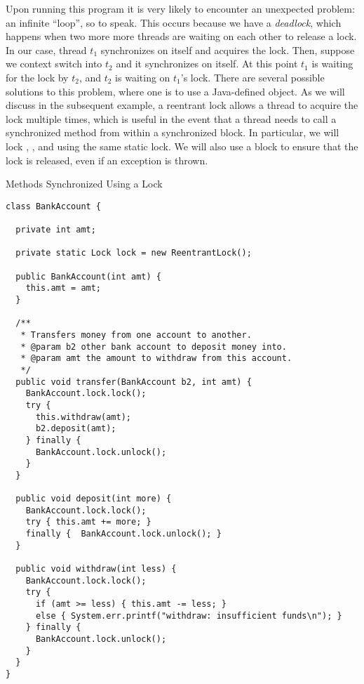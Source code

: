 Upon running this program it is very likely to encounter an unexpected problem: an infinite ``loop'', so to speak. This occurs because we have a \textit{deadlock}, which happens when two more more threads are waiting on each other to release a lock. In our case, thread $t_1$ synchronizes on itself and acquires the lock. Then, suppose we context switch into $t_2$ and it synchronizes on itself. At this point $t_1$ is waiting for the lock by $t_2$, and $t_2$ is waiting on $t_1$'s lock. There are several possible solutions to this problem, where one is to use a Java-defined  object. As we will discuss in the subsequent example, a reentrant lock allows a thread to acquire the lock multiple times, which is useful in the event that a thread needs to call a synchronized method from within a synchronized block. In particular, we will lock , , and  using the same static lock. We will also use a  block to ensure that the lock is released, even if an exception is thrown.

\begin{cl}[]{Methods Synchronized Using a Lock}
\begin{lstlisting}[language=MyJava]
class BankAccount {

  private int amt;

  private static Lock lock = new ReentrantLock();

  public BankAccount(int amt) {
    this.amt = amt;
  }

  /**
   * Transfers money from one account to another.
   * @param b2 other bank account to deposit money into.
   * @param amt the amount to withdraw from this account.
   */
  public void transfer(BankAccount b2, int amt) {
    BankAccount.lock.lock();
    try {
      this.withdraw(amt);
      b2.deposit(amt);
    } finally {
      BankAccount.lock.unlock();
    }
  }

  public void deposit(int more) {
    BankAccount.lock.lock();
    try { this.amt += more; } 
    finally {  BankAccount.lock.unlock(); }
  }

  public void withdraw(int less) {
    BankAccount.lock.lock();
    try {
      if (amt >= less) { this.amt -= less; }
      else { System.err.printf("withdraw: insufficient funds\n"); }
    } finally {
      BankAccount.lock.unlock();
    }
  }
}
\end{lstlisting}
\end{cl}


